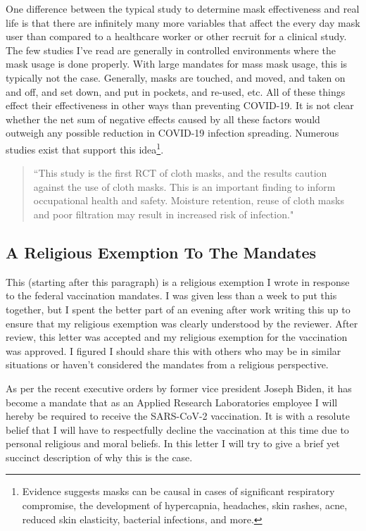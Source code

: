 \documentclass[10pt, a4paper, twocolumn]{book}
\begin{document}
One difference between the typical study to determine mask effectiveness and real life is that there are infinitely many more variables that affect the every day mask user than compared to a healthcare worker or other recruit for a clinical study. The few studies I've read are generally in controlled environments where the mask usage is done properly. With large mandates for mass mask usage, this is typically not the case. Generally, masks are touched, and moved, and taken on and off, and set down, and put in pockets, and re-used, etc. All of these things effect their effectiveness in other ways than preventing COVID-19. It is not clear whether the net sum of negative effects caused by all these factors would outweigh any possible reduction in COVID-19 infection spreading. Numerous studies exist that support this idea\footnote{Evidence suggests masks can be causal in cases of significant respiratory compromise, the development of hypercapnia, headaches, skin rashes, acne, reduced skin elasticity, bacterial infections, and more.}.

\begin{quotation}
	``This study is the first RCT of cloth masks, and the results caution against the use of cloth masks. This is an important finding to inform occupational health and safety. Moisture retention, reuse of cloth masks and poor filtration may result in increased risk of infection." \citep{ClothMasksBad}
\end{quotation}






\subsection{A Religious Exemption To The Mandates}

This (starting after this paragraph) is a religious exemption I wrote in response to the federal vaccination mandates. I was given less than a week to put this together, but I spent the better part of an evening after work writing this up to ensure that my religious exemption was clearly understood by the reviewer. After review, this letter was accepted and my religious exemption for the vaccination was approved. I figured I should share this with others who may be in similar situations or haven't considered the mandates from a religious perspective.

As per the recent executive orders by former vice president Joseph Biden, it has become a mandate that as an Applied Research Laboratories employee I will hereby be required to receive the SARS-CoV-2 vaccination. It is with a resolute belief that I will have to respectfully decline the vaccination at this time due to personal religious and moral beliefs. In this letter I will try to give a brief yet succinct description of why this is the case. 
\end{document}
